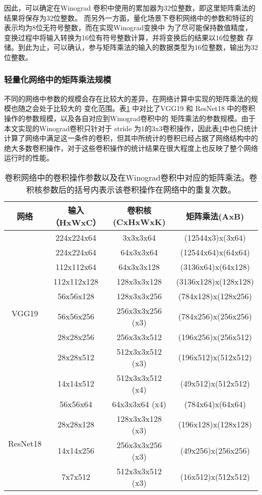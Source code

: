 因此，可以确定在Winograd 卷积中使用的累加器为32位整数，即这里矩阵乘法的结果将保存为32位整数。
而另外一方面，量化场景下卷积网络中的参数和特征的表示均为8位无符号整数，而在实现Winograd变换中
为了尽可能保持数值精度，变换过程中将输入转换为16位有符号整数计算，并将变换后的结果以16位整数
存储。到此为止，可以确认，参与矩阵乘法的输入的数据类型为16位整数，输出为32位整数。

\subsubsection{轻量化网络中的矩阵乘法规模}

不同的网络中参数的规模会存在比较大的差异，在网络计算中实现的矩阵乘法的规模也随之会处于比较大的
变化范围。表\ref{tbl:conv-matmul} 中对比了VGG19 和 ResNet18 中的卷积操作的参数规模，以及各自对应到Winograd卷积中的
矩阵乘法的参数规模。由于本文实现的Winograd卷积只针对于 stride 为1的3x3卷积操作，因此表\ref{tbl:conv-matmul}中也只统计计算了网络中满足这一条件的卷积，但其中所统计的卷积已经占据了网络结构中的绝大多数卷积操作，对于这些卷积操作的统计结果在很大程度上也反映了整个网络运行时的性能。

\begin{table}[]
  \centering
  \caption{卷积网络中的卷积操作参数以及在Winograd卷积中对应的矩阵乘法。卷积核参数后的括号内表示该卷积操作在网络中的重复次数。}
  \begin{tabular}{cccc}
    \toprule
    网络 & 输入（HxWxC） & 卷积核 (CxHxWxK) & 矩阵乘法(AxB) \\
    \midrule
    \multirow{9}{*}{VGG19} & 224x224x64 & 3x3x3x64 & (12544x3)x(3x64)\\
                          & 224x224x64 & 64x3x3x64 & (12544x64)x(64x64)\\
                          & 112x112x64 &  64x3x3x128 & (3136x64)x(64x128)\\
                          & 112x112x128 &  128x3x3x128 & (3136x128)x(128x128)\\
                          & 56x56x128 & 128x3x3x256 & (784x128)x(128x256)\\
                          & 56x56x256 & 256x3x3x256 (x3) & (784x256)x(256x256)\\
                          & 28x28x256 & 256x3x3x512 & (196x256)x(256x512)\\
                          & 28x28x512 & 512x3x3x512 (x3) & (196x512)x(512x512)\\
                          & 14x14x512 & 512x3x3x512 (x4) & (49x512)x(512x512)\\
    \hline
    \multirow{4}{*}{ResNet18} & 56x56x64 & 64x3x3x64 (x4) & (784x64)x(64x64)\\
                             & 28x28x128 & 128x3x3x128 (x3) & (196x128)x(128x128)\\
                             & 14x14x256 & 256x3x3x256 (x3) & (49x256)x(256x256)\\
                             & 7x7x512 & 512x3x3x512 (x3) & (16x512)x(512x512)\\
    \bottomrule
  \end{tabular}
  \label{tbl:conv-matmul}
\end{table}

